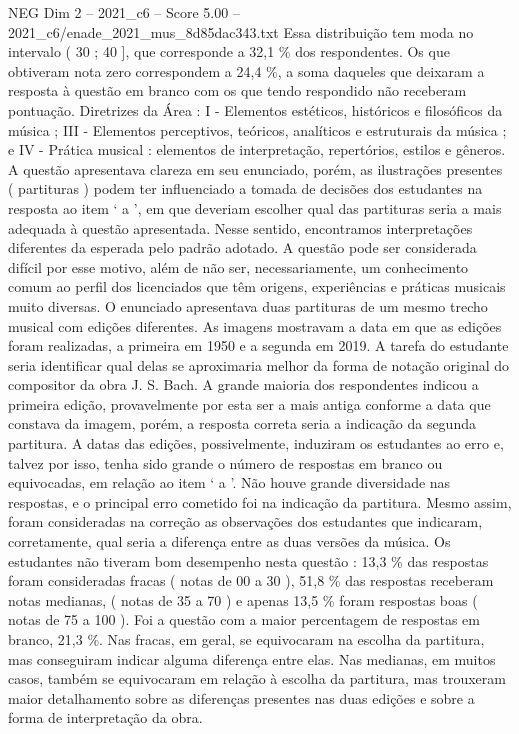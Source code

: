 \begin{textsample}{NEG Dim 2 – 2021\_c6 – Score 5.00 – 2021\_c6/enade\_2021\_mus\_8d85dac343.txt}
Essa distribuição tem moda no intervalo ( 30 ; 40 ], que corresponde a 32,1 \% dos respondentes.
Os que obtiveram nota zero correspondem a 24,4 \%, a soma daqueles que deixaram a resposta à questão em branco com os que tendo respondido não receberam pontuação.
Diretrizes da Área : I - Elementos estéticos, históricos e filosóficos da música ; III - Elementos perceptivos, teóricos, analíticos e estruturais da música ; e IV - Prática musical : elementos de interpretação, repertórios, estilos e gêneros.
A questão apresentava clareza em seu enunciado, porém, as ilustrações presentes ( partituras ) podem ter influenciado a tomada de decisões dos estudantes na resposta ao item ‘ a ’, em que deveriam escolher qual das partituras seria a mais adequada à questão apresentada.
Nesse sentido, encontramos interpretações diferentes da esperada pelo padrão adotado.
A questão pode ser considerada difícil por esse motivo, além de não ser, necessariamente, um conhecimento comum ao perfil dos licenciados que têm origens, experiências e práticas musicais muito diversas.
O enunciado apresentava duas partituras de um mesmo trecho musical com edições diferentes.
As imagens mostravam a data em que as edições foram realizadas, a primeira em 1950 e a segunda em 2019.
A tarefa do estudante seria identificar qual delas se aproximaria melhor da forma de notação original do compositor da obra J.
S.
Bach.
A grande maioria dos respondentes indicou a primeira edição, provavelmente por esta ser a mais antiga conforme a data que constava da imagem, porém, a resposta correta seria a indicação da segunda partitura.
A datas das edições, possivelmente, induziram os estudantes ao erro e, talvez por isso, tenha sido grande o número de respostas em branco ou equivocadas, em relação ao item ‘ a ’.
Não houve grande diversidade nas respostas, e o principal erro cometido foi na indicação da partitura.
Mesmo assim, foram consideradas na correção as observações dos estudantes que indicaram, corretamente, qual seria a diferença entre as duas versões da música.
Os estudantes não tiveram bom desempenho nesta questão : 13,3 \% das respostas foram consideradas fracas ( notas de 00 a 30 ), 51,8 \% das respostas receberam notas medianas, ( notas de 35 a 70 ) e apenas 13,5 \% foram respostas boas ( notas de 75 a 100 ).
Foi a questão com a maior percentagem de respostas em branco, 21,3 \%.
Nas fracas, em geral, se equivocaram na escolha da partitura, mas conseguiram indicar alguma diferença entre elas.
Nas medianas, em muitos casos, também se equivocaram em relação à escolha da partitura, mas trouxeram maior detalhamento sobre as diferenças presentes nas duas edições e sobre a forma de interpretação da obra.

\end{textsample}
